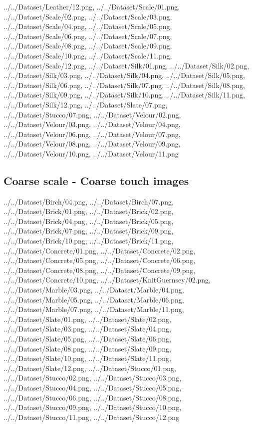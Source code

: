 {../../Dataset/Leather/12.png,
../../Dataset/Scale/01.png,
../../Dataset/Scale/02.png,
../../Dataset/Scale/03.png,
../../Dataset/Scale/04.png,
../../Dataset/Scale/05.png,
../../Dataset/Scale/06.png,
../../Dataset/Scale/07.png,
../../Dataset/Scale/08.png,
../../Dataset/Scale/09.png,
../../Dataset/Scale/10.png,
../../Dataset/Scale/11.png,
../../Dataset/Scale/12.png,
../../Dataset/Silk/01.png,
../../Dataset/Silk/02.png,
../../Dataset/Silk/03.png,
../../Dataset/Silk/04.png,
../../Dataset/Silk/05.png,
../../Dataset/Silk/06.png,
../../Dataset/Silk/07.png,
../../Dataset/Silk/08.png,
../../Dataset/Silk/09.png,
../../Dataset/Silk/10.png,
../../Dataset/Silk/11.png,
../../Dataset/Silk/12.png,
../../Dataset/Slate/07.png,
../../Dataset/Stucco/07.png,
../../Dataset/Velour/02.png,
../../Dataset/Velour/03.png,
../../Dataset/Velour/04.png,
../../Dataset/Velour/06.png,
../../Dataset/Velour/07.png,
../../Dataset/Velour/08.png,
../../Dataset/Velour/09.png,
../../Dataset/Velour/10.png,
../../Dataset/Velour/11.png}

\newpage
\subsection{Coarse scale - Coarse touch images}
{../../Dataset/Birch/04.png,
../../Dataset/Birch/07.png,
../../Dataset/Brick/01.png,
../../Dataset/Brick/02.png,
../../Dataset/Brick/04.png,
../../Dataset/Brick/05.png,
../../Dataset/Brick/07.png,
../../Dataset/Brick/09.png,
../../Dataset/Brick/10.png,
../../Dataset/Brick/11.png,
../../Dataset/Concrete/01.png,
../../Dataset/Concrete/02.png,
../../Dataset/Concrete/05.png,
../../Dataset/Concrete/06.png,
../../Dataset/Concrete/08.png,
../../Dataset/Concrete/09.png,
../../Dataset/Concrete/10.png,
../../Dataset/KnitGuernsey/02.png,
../../Dataset/Marble/03.png,
../../Dataset/Marble/04.png,
../../Dataset/Marble/05.png,
../../Dataset/Marble/06.png,
../../Dataset/Marble/07.png,
../../Dataset/Marble/11.png,
../../Dataset/Slate/01.png,
../../Dataset/Slate/02.png,
../../Dataset/Slate/03.png,
../../Dataset/Slate/04.png,
../../Dataset/Slate/05.png,
../../Dataset/Slate/06.png,
../../Dataset/Slate/08.png,
../../Dataset/Slate/09.png,
../../Dataset/Slate/10.png,
../../Dataset/Slate/11.png,
../../Dataset/Slate/12.png,
../../Dataset/Stucco/01.png,
../../Dataset/Stucco/02.png,
../../Dataset/Stucco/03.png,
../../Dataset/Stucco/04.png,
../../Dataset/Stucco/05.png,
../../Dataset/Stucco/06.png,
../../Dataset/Stucco/08.png,
../../Dataset/Stucco/09.png,
../../Dataset/Stucco/10.png,
../../Dataset/Stucco/11.png,
../../Dataset/Stucco/12.png}

